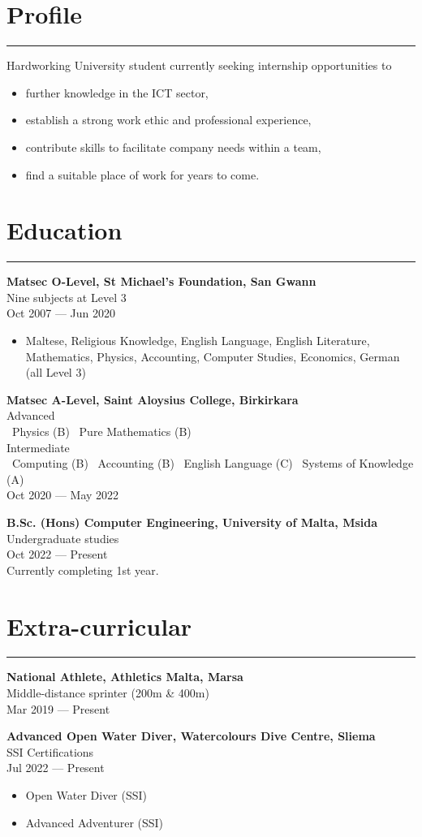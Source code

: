 \documentclass[11pt,a4paper]{article}
\newcommand{\sectionrule}{\vspace{0.25em}\color{accent}\rule{\linewidth}{0.9pt}\vspace{0.4em}}
\newcommand{\entry}[4]{%
  \noindent\textbf{#1}\\[-1pt]
  {#2}\\[-1pt]
  \textcolor{muted}{#3}\\
  #4\par\vspace{0.6em}}
\begin{document}
\begin{paracol}{2}
\section*{Profile}\sectionrule
Hardworking University student currently seeking internship opportunities to
\begin{itemize}
  \item further knowledge in the ICT sector,
  \item establish a strong work ethic and professional experience,
  \item contribute skills to facilitate company needs within a team,
  \item find a suitable place of work for years to come.
\end{itemize}

\section*{Education}\sectionrule
\entry{Matsec O-Level, St Michael's Foundation, San Gwann}{Nine subjects at Level 3}{Oct 2007 — Jun 2020}{\begin{itemize}
  \item Maltese, Religious Knowledge, English Language, English Literature, Mathematics, Physics, Accounting, Computer Studies, Economics, German (all Level 3)
\end{itemize}}

\entry{Matsec A-Level, Saint Aloysius College, Birkirkara}{Advanced \\
  \hspace*{0.75em}\textbullet\ Physics (B)\;\; \textbullet\ Pure Mathematics (B) \\
  Intermediate \\
  \hspace*{0.75em}\textbullet\ Computing (B)\;\; \textbullet\ Accounting (B)\;\; \textbullet\ English Language (C)\;\; \textbullet\ Systems of Knowledge (A)}{Oct 2020 — May 2022}{}

\entry{B.Sc. (Hons) Computer Engineering, University of Malta, Msida}{Undergraduate studies}{Oct 2022 — Present}{Currently completing 1st year.}

\section*{Extra-curricular}\sectionrule
\entry{National Athlete, Athletics Malta, Marsa}{Middle-distance sprinter (200m \& 400m)}{Mar 2019 — Present}{}
\entry{Advanced Open Water Diver, Watercolours Dive Centre, Sliema}{SSI Certifications}{Jul 2022 — Present}{\begin{itemize}
  \item Open Water Diver (SSI)
  \item Advanced Adventurer (SSI)
\end{itemize}}


\end{paracol}
\end{document}

